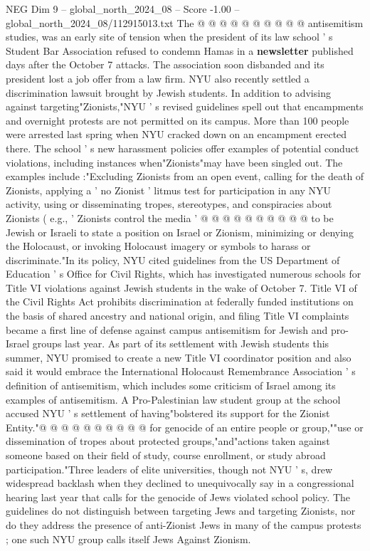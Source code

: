 \begin{textsample}{NEG Dim 9 – global\_north\_2024\_08 – Score -1.00 – global\_north\_2024\_08/112915013.txt}
The @ @ @ @ @ @ @ @ @ @ antisemitism studies, was an early site of tension when the president of its law school ' s Student Bar Association refused to condemn Hamas in a \textbf{newsletter} published days after the October 7 attacks.
The association soon disbanded and its president lost a job offer from a law firm.
NYU also recently settled a discrimination lawsuit brought by Jewish students.
In addition to advising against targeting"Zionists,"NYU ' s revised guidelines spell out that encampments and overnight protests are not permitted on its campus.
More than 100 people were arrested last spring when NYU cracked down on an encampment erected there.
The school ' s new harassment policies offer examples of potential conduct violations, including instances when"Zionists"may have been singled out.
The examples include :"Excluding Zionists from an open event, calling for the death of Zionists, applying a ' no Zionist ' litmus test for participation in any NYU activity, using or disseminating tropes, stereotypes, and conspiracies about Zionists ( e.g., ' Zionists control the media ' @ @ @ @ @ @ @ @ @ @ to be Jewish or Israeli to state a position on Israel or Zionism, minimizing or denying the Holocaust, or invoking Holocaust imagery or symbols to harass or discriminate."In its policy, NYU cited guidelines from the US Department of Education ' s Office for Civil Rights, which has investigated numerous schools for Title VI violations against Jewish students in the wake of October 7.
Title VI of the Civil Rights Act prohibits discrimination at federally funded institutions on the basis of shared ancestry and national origin, and filing Title VI complaints became a first line of defense against campus antisemitism for Jewish and pro-Israel groups last year.
As part of its settlement with Jewish students this summer, NYU promised to create a new Title VI coordinator position and also said it would embrace the International Holocaust Remembrance Association ' s definition of antisemitism, which includes some criticism of Israel among its examples of antisemitism.
A Pro-Palestinian law student group at the school accused NYU ' s settlement of having"bolstered its support for the Zionist Entity."@ @ @ @ @ @ @ @ @ @ for genocide of an entire people or group,""use or dissemination of tropes about protected groups,"and"actions taken against someone based on their field of study, course enrollment, or study abroad participation."Three leaders of elite universities, though not NYU ' s, drew widespread backlash when they declined to unequivocally say in a congressional hearing last year that calls for the genocide of Jews violated school policy.
The guidelines do not distinguish between targeting Jews and targeting Zionists, nor do they address the presence of anti-Zionist Jews in many of the campus protests ; one such NYU group calls itself Jews Against Zionism.

\end{textsample}

